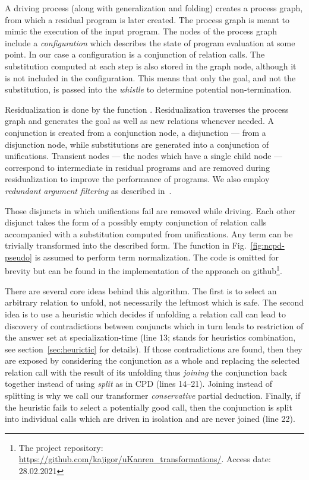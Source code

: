 A driving process (along with generalization and folding) creates a process graph, from which a residual program is later created.
The process graph is meant to mimic the execution of the input program.
The nodes of the process graph include a \emph{configuration} which describes the state of program evaluation at some point.
In our case a configuration is a conjunction of relation calls.
The substitution computed at each step is also stored in the graph node, although it is not included in the configuration.
This means that only the goal, and not the substitution, is passed into the \emph{whistle} to determine potential non-termination.

Residualization is done by the function .
Residualization traverses the process graph and generates the \mk goal as well as new relations whenever needed.
A conjunction is created from a conjunction node, a disjunction --- from a disjunction node, while substitutions are generated into a conjunction of unifications.
Transient nodes --- the nodes which have a single child node --- correspond to intermediate  in residual programs and are removed during residualization to improve the performance of programs.
We also employ \emph{redundant argument filtering} as described in~\cite{leuschel1996redundant}.

Those disjuncts in which unifications fail are removed while driving.
Each other disjunct takes the form of a possibly empty conjunction of relation calls accompanied with a substitution computed from unifications.
Any \mk term can be trivially transformed into the described form.
The function  in Fig.~\ref{fig:ncpd-pseudo} is assumed to perform term normalization.
The code is omitted for brevity but can be found in the implementation of the approach on github\footnote{The project repository: \url{https://github.com/kajigor/uKanren_transformations/}. Access date: 28.02.2021}.



There are several core ideas behind this algorithm.
The first is to select an arbitrary relation to unfold, not necessarily the leftmost which is safe.
The second idea is to use a heuristic which decides if unfolding a relation call can lead to discovery of contradictions between conjuncts which in turn leads to restriction of the answer set at specialization-time (line 13;  stands for heuristics combination, see section~\ref{sec:heurictic} for details).
If those contradictions are found, then they are exposed by considering the conjunction as a whole and replacing the selected relation call with the result of its unfolding thus \emph{joining} the conjunction back together instead of using \emph{split} as in CPD (lines 14--21).
Joining instead of splitting is why we call our transformer \emph{conservative} partial deduction.
Finally, if the heuristic fails to select a potentially good call, then the conjunction is split into individual calls which are driven in isolation and are never joined (line 22).

